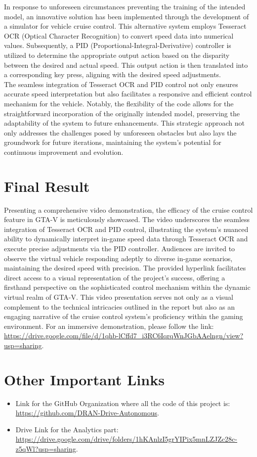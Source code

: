 In response to unforeseen circumstances preventing the training of the intended model, an innovative solution has been implemented through the development of a simulator for vehicle cruise control. This alternative system employs Tesseract OCR (Optical Character Recognition) to convert speed data into numerical values. Subsequently, a PID (Proportional-Integral-Derivative) controller is utilized to determine the appropriate output action based on the disparity between the desired and actual speed. This output action is then translated into a corresponding key press, aligning with the desired speed adjustments.
\\
The seamless integration of Tesseract OCR and PID control not only ensures accurate speed interpretation but also facilitates a responsive and efficient control mechanism for the vehicle. Notably, the flexibility of the code allows for the straightforward incorporation of the originally intended model, preserving the adaptability of the system to future enhancements. This strategic approach not only addresses the challenges posed by unforeseen obstacles but also lays the groundwork for future iterations, maintaining the system's potential for continuous improvement and evolution.

\section{Final Result}
Presenting a comprehensive video demonstration, the efficacy of the cruise control feature in GTA-V is meticulously showcased. The video underscores the seamless integration of Tesseract OCR and PID control, illustrating the system's nuanced ability to dynamically interpret in-game speed data through Tesseract OCR and execute precise adjustments via the PID controller. Audiences are invited to observe the virtual vehicle responding adeptly to diverse in-game scenarios, maintaining the desired speed with precision. The provided hyperlink facilitates direct access to a visual representation of the project's success, offering a firsthand perspective on the sophisticated control mechanism within the dynamic virtual realm of GTA-V. This video presentation serves not only as a visual complement to the technical intricacies outlined in the report but also as an engaging narrative of the cruise control system's proficiency within the gaming environment. For an immersive demonstration, please follow the link: \url{https://drive.google.com/file/d/1qhb-lCffd7_i3RC6IqrqWnJGbAAelngn/view?usp=sharing}.

\section{Other Important Links}
\begin{itemize}
    \item Link for the GitHub Organization where all the code of this project is: \url{https://github.com/DRAN-Drive-Autonomous}.
    \item Drive Link for the Analytics part: \url{https://drive.google.com/drive/folders/1hKAnlzI5grYIPix5mnLZJZc28c-z5qWl?usp=sharing}.
\end{itemize}
